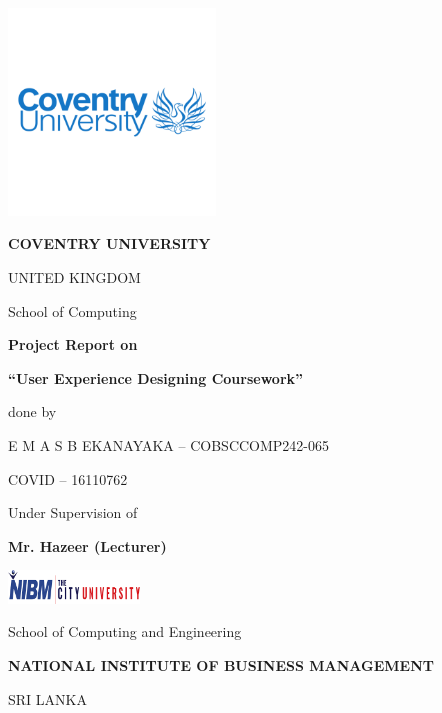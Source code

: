 \documentclass[12pt,a4paper]{article}
\begin{document}
\begin{titlepage}
    \centering
    \vspace*{0.3cm}
    
    \includegraphics[width=5.5cm]{coventry-logo.png} %
    
    \vspace{1cm}
    
    {\Huge\bfseries COVENTRY UNIVERSITY}
    
    {\Large UNITED KINGDOM}
    
    \vspace{1cm}
    
    {\Large School of Computing}
    
    \vspace{1.2cm}
    
    {\huge\bfseries Project Report on}
    
    \vspace{0.3cm}
    
    {\Huge\bfseries ``User Experience Designing Coursework''}
    
    \vspace{1.2cm}
    
    {\Large done by}
    
    \vspace{0.3cm}
    
    {\Large E M A S B EKANAYAKA – COBSCCOMP242-065} %
    
    {\Large COVID – 16110762}
    
    \vspace{0.8cm}
    
    {\Large Under Supervision of}
    
    \vspace{0.3cm}
    
    {\Large\bfseries Mr. Hazeer (Lecturer)}
    
    \vfill %
    
    \includegraphics[width=3.5cm]{nibm-logo.png} %
    
    \vspace{0.3cm}
    
    {\Large School of Computing and Engineering}
    
    {\Large\bfseries NATIONAL INSTITUTE OF BUSINESS MANAGEMENT}
    
    {\Large SRI LANKA}
    
\end{titlepage}
\end{document}
